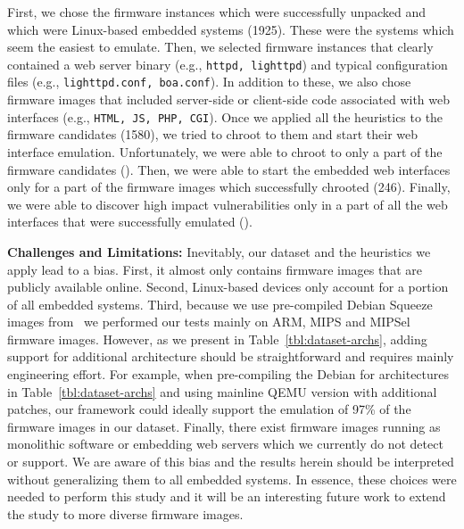 \documentclass[conference]{./templates/ndss/IEEEtran}
\newcounter{t0d0_counter}
\newcounter{pr00f_counter}
\newcommand{\countfirmwarewebTP}{1925}
\newcommand{\countfirmwareforemulation}{1580}
\newcommand{\CountFirmwareEmulatedWebServerStarted}{246}
\begin{document}
    First, we chose the firmware instances which were successfully unpacked 
and which were Linux-based embedded systems (\countfirmwarewebTP{}). 
These were the systems which seem the easiest to emulate.
Then, we selected firmware instances that clearly contained a web server binary
(e.g., \texttt{httpd, lighttpd}) and typical configuration files 
(e.g., \texttt{lighttpd.conf, boa.conf}). In addition to these, we also 
chose firmware images that included server-side or client-side code associated with 
web interfaces (e.g., \texttt{HTML, JS, PHP, CGI}). Once we applied all the heuristics to the firmware candidates 
(\countfirmwareforemulation{}), we tried to chroot to them and start 
their web interface emulation. 
    Unfortunately, we were able to chroot to only a part of the firmware 
candidates (\CountFirmwareEmulatedOK{}). Then, we were able to start the 
embedded web interfaces only for a part of the firmware images which 
successfully chrooted (\CountFirmwareEmulatedWebServerStarted{}). Finally, 
we were able to discover high impact vulnerabilities only in a part of 
all the web interfaces that were successfully emulated (\countfirmwarestotal{}). 



\noindent \textbf{Challenges and Limitations:}
Inevitably, our dataset and the heuristics we apply lead to a bias. 
    First, it almost only contains firmware images that are publicly available 
online. Second, Linux-based devices only account for a portion of all embedded systems. 
    Third, because we use pre-compiled Debian Squeeze images from~\cite{aurel32qemu} 
we performed our tests mainly on ARM, MIPS and MIPSel firmware images. 
However, as we present in Table~\ref{tbl:dataset-archs}, adding support 
for additional architecture should be straightforward and requires mainly 
engineering effort. For example, when pre-compiling the Debian for 
architectures in Table~\ref{tbl:dataset-archs} and using mainline QEMU 
version with additional patches, our framework could ideally support the 
emulation of  97\% of the firmware images in our dataset. 
    Finally, there exist firmware images 
running as monolithic software or embedding web servers which we currently
do not detect or support. 
We are aware of this bias and the results herein should be
interpreted without generalizing them to all embedded systems. In essence, these choices were needed to perform this study and it will be
an interesting future work to extend the study to more diverse
firmware images.
\end{document}
